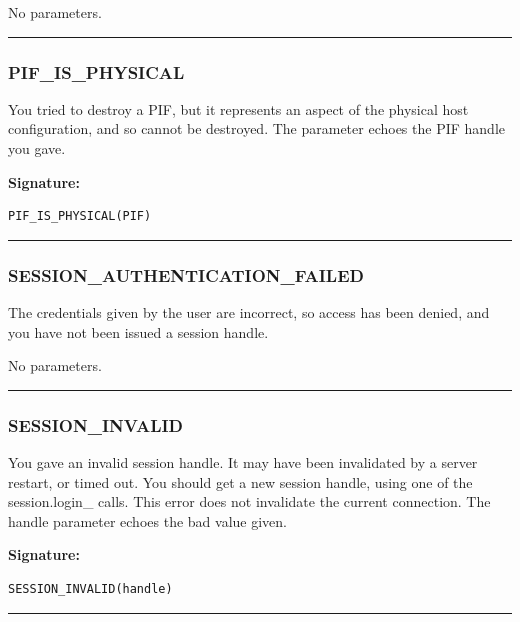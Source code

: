 \vspace{0.3cm}
No parameters.
\begin{center}\rule{10em}{0.1pt}\end{center}

\subsubsection{PIF\_IS\_PHYSICAL}

You tried to destroy a PIF, but it represents an aspect of the physical
host configuration, and so cannot be destroyed.  The parameter echoes the
PIF handle you gave.

\vspace{0.3cm}
{\bf Signature:}
\begin{verbatim}PIF_IS_PHYSICAL(PIF)\end{verbatim}
\begin{center}\rule{10em}{0.1pt}\end{center}

\subsubsection{SESSION\_AUTHENTICATION\_FAILED}

The credentials given by the user are incorrect, so access has been denied,
and you have not been issued a session handle.

\vspace{0.3cm}
No parameters.
\begin{center}\rule{10em}{0.1pt}\end{center}

\subsubsection{SESSION\_INVALID}

You gave an invalid session handle.  It may have been invalidated by a
server restart, or timed out.  You should get a new session handle, using
one of the session.login\_ calls.  This error does not invalidate the
current connection.  The handle parameter echoes the bad value given.

\vspace{0.3cm}
{\bf Signature:}
\begin{verbatim}SESSION_INVALID(handle)\end{verbatim}
\begin{center}\rule{10em}{0.1pt}\end{center}

